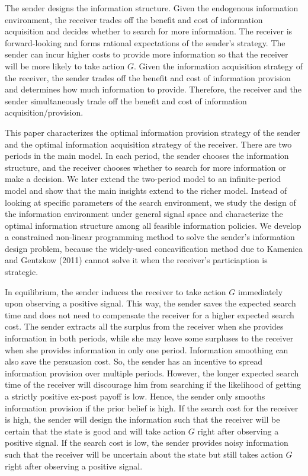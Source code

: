 \documentclass[11pt]{extarticle}
\begin{document}
The sender designs the information structure. Given the endogenous information environment, the receiver trades off the benefit and cost of information acquisition and decides whether to search for more information. The receiver is forward-looking and forms rational expectations of the sender's strategy. The sender can incur higher costs to provide more information so that the receiver will be more likely to take action $G$. Given the information acquisition strategy of the receiver, the sender trades off the benefit and cost of information provision and determines how much information to provide. Therefore, the receiver and the sender simultaneously trade off the benefit and cost of information acquisition/provision. 

This paper characterizes the optimal information provision strategy of the sender and the optimal information acquisition strategy of the receiver. There are two periods in the main model. In each period, the sender chooses the information structure, and the receiver chooses whether to search for more information or make a decision.  We later extend the two-period model to an infinite-period model and show that the main insights extend to the richer model. Instead of looking at specific parameters of the search environment, we study the design of the information environment under general signal space and characterize the optimal information structure among all feasible information policies. We develop a constrained non-linear programming method to solve the sender's information design problem, because the widely-used concavification method due to Kamenica and Gentzkow (2011) cannot solve it when the receiver's particiaption is strategic. 

In equilibrium, the sender induces the receiver to take action $G$ immediately upon observing a positive signal. This way, the sender saves the expected search time and does not need to compensate the receiver for a higher expected search cost. The sender extracts all the surplus from the receiver when she provides information in both periods, while she may leave some surpluses to the receiver when she provides information in only one period. Information smoothing can also save the persuasion cost. So, the sender has an incentive to spread information provision over multiple periods. However, the longer expected search time of the receiver will discourage him from searching if the likelihood of getting a strictly positive ex-post payoff is low. Hence, the sender only smooths information provision if the prior belief is high. If the search cost for the receiver is high, the sender will design the information such that the receiver will be certain that the state is good and will take action $G$ right after observing a positive signal. If the search cost is low, the sender provides noisy information such that the receiver will be uncertain about the state but still takes action $G$ right after observing a positive signal.
\end{document}
